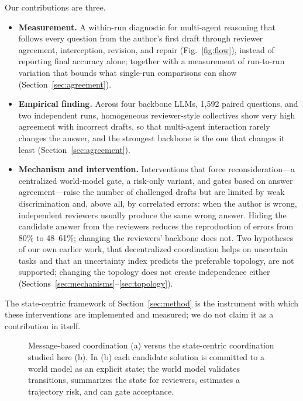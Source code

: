 \documentclass[manuscript, screen, review]{acmart}
\begin{document}
Our contributions are three.
\begin{itemize}
    \item \textbf{Measurement.} A within-run diagnostic for multi-agent reasoning that follows every question from the author's first draft through reviewer agreement, interception, revision, and repair (Fig.~\ref{fig:flow}), instead of reporting final accuracy alone; together with a measurement of run-to-run variation that bounds what single-run comparisons can show (Section~\ref{sec:agreement}).
    \item \textbf{Empirical finding.} Across four backbone LLMs, 1{,}592 paired questions, and two independent runs, homogeneous reviewer-style collectives show very high agreement with incorrect drafts, so that multi-agent interaction rarely changes the answer, and the strongest backbone is the one that changes it least (Section~\ref{sec:agreement}).
    \item \textbf{Mechanism and intervention.} Interventions that force reconsideration---a centralized world-model gate, a risk-only variant, and gates based on answer agreement---raise the number of challenged drafts but are limited by weak discrimination and, above all, by correlated errors: when the author is wrong, independent reviewers usually produce the same wrong answer. Hiding the candidate answer from the reviewers reduces the reproduction of errors from 80\% to 48--61\%; changing the reviewers' backbone does not. Two hypotheses of our own earlier work, that decentralized coordination helps on uncertain tasks and that an uncertainty index predicts the preferable topology, are not supported; changing the topology does not create independence either (Sections~\ref{sec:mechanisms}--\ref{sec:topology}).
\end{itemize}
The state-centric framework of Section~\ref{sec:method} is the instrument with which these interventions are implemented and measured; we do not claim it as a contribution in itself.

\begin{figure}[!t]
    \centering
    \resizebox{\textwidth}{!}{}
    \caption{Message-based coordination (a) versus the state-centric coordination studied here (b). In (b) each candidate solution is committed to a world model as an explicit state; the world model validates transitions, summarizes the state for reviewers, estimates a trajectory risk, and can gate acceptance.}
    \label{fig:concept}
\end{figure}
\end{document}
